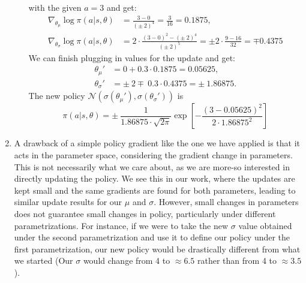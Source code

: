 \documentclass{article}
\begin{document}
\begin{enumerate}
\begin{enumerate}
		            with the given $a=3$ and get:
		            \begin{align*}
			            \nabla_{\theta_\mu} \log \pi(a|s, \theta)    & = \frac{3-0}{(\pm~2)^4}
			            = \frac{3}{16} = 0.1875,                                               \\
			            \nabla_{\theta_\sigma} \log \pi(a|s, \theta) & = 2 \cdot \frac{
				            (3-0)^2-(\pm~2)^4 }{(\pm ~2)^5} = \pm 2 \cdot \frac{9 - 16}{32} = \mp 0.4375
		            \end{align*}
		            We can finish plugging in values for the update and get:
		            \begin{align}
			            \theta_\mu'    & =  0 + 0.3 \cdot 0.1875 = 0.05625,              \\
			            \theta_\sigma' & =  \pm~ 2 \mp~ 0.3 \cdot 0.4375 = \pm~ 1.86875.
		            \end{align}
		            The new policy $\mathcal{N}(\sigma(\theta_\mu'), \sigma(\theta_\sigma'))$ is
		            \begin{equation}
			            \pi(a|s, \theta) = \pm~ \frac{1}{1.86875 \cdot \sqrt{2 \pi}}\exp\left[-\frac{(3
					            - 0.05625)^2}{2 \cdot 1.86875^2}\right]
		            \end{equation}
	      \end{enumerate}
	\item A drawback of a simple policy gradient like the one we have applied is that it acts in the
	      parameter space, considering the gradient change in parameters. This is not necessarily what
	      we care about, as we are more-so interested in directly updating the policy. We see this in
	      our work, where the updates are kept small and the same gradients are found for both parameters,
	      leading to similar update results for our $\mu$ and $\sigma$. However, small changes in
	      parameters does not guarantee small changes in policy, particularly under different
	      parametrizations. For instance, if we were to take the new $\sigma$ value obtained under the
	      second parametrization and use it to define our policy under the first parametrization, our
	      new policy would be drastically different from what we started (Our $\sigma$ would change from
	      4 to $\approx 6.5$ rather than from 4 to $\approx 3.5$).
\end{enumerate}
\end{document}
